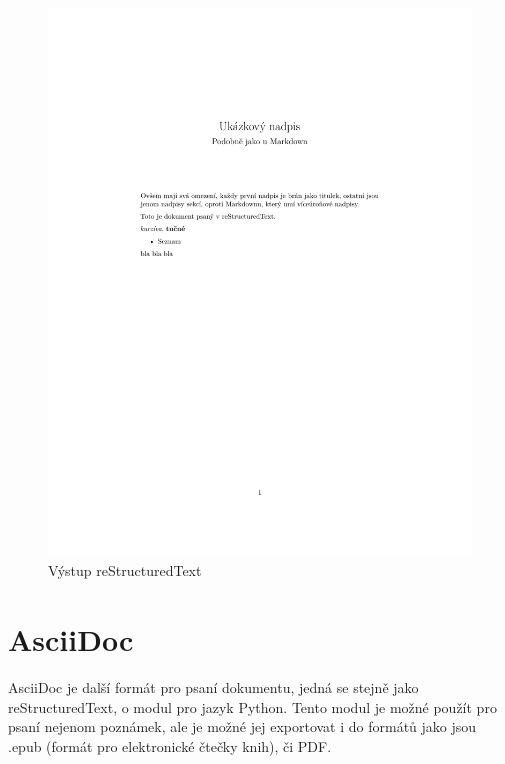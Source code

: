 \inputminted{rst}{example-rst.rst}

\begin{figure}[h]
    \centering
    \includegraphics[width=\textwidth]{example-rst.pdf}
    \caption{Výstup reStructuredText}
    \label{fig:rstOutput}
\end{figure}

\section{AsciiDoc}

AsciiDoc je další formát pro psaní dokumentu, jedná se stejně jako reStructuredText, o modul pro jazyk Python. Tento modul je možné použít pro psaní nejenom poznámek,
ale je možné jej exportovat i do formátů jako jsou .epub (formát pro elektronické čtečky knih), či PDF. \cite{asciiDoc}

\inputminted{text}{example-ascii.adoc}


